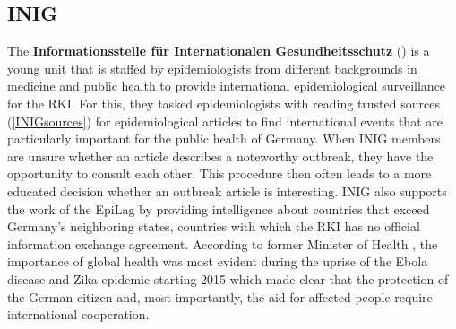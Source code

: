 \subsection{INIG}
The \textbf{Informationsstelle für Internationalen Gesundheitsschutz} () is a young unit that is staffed by epidemiologists from different backgrounds in medicine and public health to provide international epidemiological surveillance for the RKI.
For this, they tasked epidemiologists with reading trusted sources (\ref{INIGsources}) for epidemiological articles to find international events that are particularly important for the public health of Germany.
When INIG members are unsure whether an article describes a noteworthy outbreak, they have the opportunity to consult each other.
This procedure then often leads to a more educated decision whether an outbreak article is interesting.
INIG also supports the work of the EpiLag by providing intelligence about countries that exceed Germany's neighboring states, countries with which the RKI has no official information exchange agreement.
According to former Minister of Health \citeauthor{Grohe2017}, the importance of global health was most evident during the uprise of the Ebola disease and Zika epidemic starting 2015 which made clear that the protection of the German citizen and, most importantly, the aid for affected people require international cooperation.


